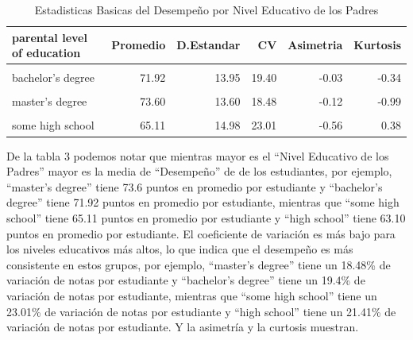 \documentclass[
]{article}
\begin{document}
\begin{table}[!h]
\centering
\caption{\label{tab:caculos basicos}Estadisticas Basicas del Desempeño por Nivel Educativo de los Padres}
\centering
\begin{tabular}[t]{lrrrrr}
\toprule
parental level of education & Promedio & D.Estandar & CV & Asimetria & Kurtosis\\
\midrule
\cellcolor{gray!10}{associate's degree} & \cellcolor{gray!10}{69.57} & \cellcolor{gray!10}{13.67} & \cellcolor{gray!10}{19.65} & \cellcolor{gray!10}{-0.10} & \cellcolor{gray!10}{-0.65}\\
bachelor's degree & 71.92 & 13.95 & 19.40 & -0.03 & -0.34\\
\cellcolor{gray!10}{high school} & \cellcolor{gray!10}{63.10} & \cellcolor{gray!10}{13.51} & \cellcolor{gray!10}{21.41} & \cellcolor{gray!10}{-0.39} & \cellcolor{gray!10}{0.16}\\
master's degree & 73.60 & 13.60 & 18.48 & -0.12 & -0.99\\
\cellcolor{gray!10}{some college} & \cellcolor{gray!10}{68.48} & \cellcolor{gray!10}{13.71} & \cellcolor{gray!10}{20.02} & \cellcolor{gray!10}{-0.38} & \cellcolor{gray!10}{0.23}\\
\addlinespace
some high school & 65.11 & 14.98 & 23.01 & -0.56 & 0.38\\
\bottomrule
\end{tabular}
\end{table}

De la tabla 3 podemos notar que mientras mayor es el ``Nivel Educativo
de los Padres'' mayor es la media de ``Desempeño'' de de los
estudiantes, por ejemplo, ``master's degree'' tiene 73.6 puntos en
promedio por estudiante y ``bachelor's degree'' tiene 71.92 puntos en
promedio por estudiante, mientras que ``some high school'' tiene 65.11
puntos en promedio por estudiante y ``high school'' tiene 63.10 puntos
en promedio por estudiante. El coeficiente de variación es más bajo para
los niveles educativos más altos, lo que indica que el desempeño es más
consistente en estos grupos, por ejemplo, ``master's degree'' tiene un
18.48\% de variación de notas por estudiante y ``bachelor's degree''
tiene un 19.4\% de variación de notas por estudiante, mientras que
``some high school'' tiene un 23.01\% de variación de notas por
estudiante y ``high school'' tiene un 21.41\% de variación de notas por
estudiante. Y la asimetría y la curtosis muestran.
\end{document}
